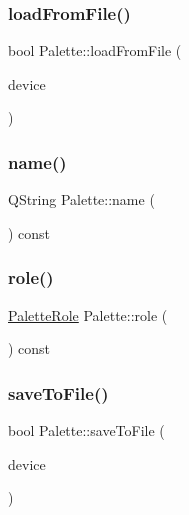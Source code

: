 \mbox{\label{class_palette_a29935a36eedbaf8d9d8b4f34da768ad5}} 
\subsubsection{\texorpdfstring{loadFromFile()}{loadFromFile()}}
{\footnotesize\ttfamily bool Palette\+::load\+From\+File (\begin{DoxyParamCaption}\item[{Q\+I\+O\+Device $\ast$}]{device }\end{DoxyParamCaption})}

\mbox{\label{class_palette_a61cddb7f609b76b9671ee6d6a71ec7ec}} 
\subsubsection{\texorpdfstring{name()}{name()}}
{\footnotesize\ttfamily Q\+String Palette\+::name (\begin{DoxyParamCaption}{ }\end{DoxyParamCaption}) const\hspace{0.3cm}{\ttfamily [inline]}}

\mbox{\label{class_palette_a2212ef50b1124725707c033bbedc786f}} 
\subsubsection{\texorpdfstring{role()}{role()}}
{\footnotesize\ttfamily \mbox{\hyperlink{palettemanager_8h_adf4610684920d9165d0d74c1ea45b269}{Palette\+Role}} Palette\+::role (\begin{DoxyParamCaption}{ }\end{DoxyParamCaption}) const\hspace{0.3cm}{\ttfamily [inline]}}

\mbox{\label{class_palette_a678521bb829cb9b408983c6c20b34760}} 
\subsubsection{\texorpdfstring{saveToFile()}{saveToFile()}}
{\footnotesize\ttfamily bool Palette\+::save\+To\+File (\begin{DoxyParamCaption}\item[{Q\+I\+O\+Device $\ast$}]{device }\end{DoxyParamCaption})}

